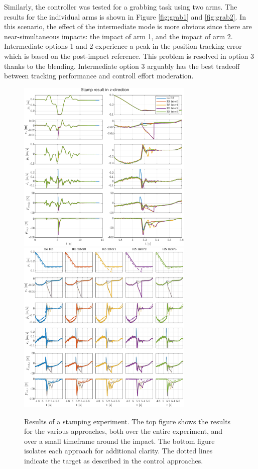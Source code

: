 \documentclass[11pt]{report}
\numberwithin{equation}{section}        %
\numberwithin{figure}{section}          %
\numberwithin{table}{section}           %
\begin{document}
  Similarly, the controller was tested for a grabbing task using two arms. The results for the individual arms is shown in Figure \ref{fig:grab1} and \ref{fig:grab2}. In this scenario, the effect of the intermediate mode is more obvious since there are near-simultaneous impacts: the impact of arm 1, and the impact of arm 2. Intermediate options 1 and 2 experience a peak in the position tracking error which is based on the post-impact reference. This problem is resolved in option 3 thanks to the blending. Intermediate option 3 arguably has the best tradeoff between tracking performance and controll effort moderation.

\begin{figure}[]
  \centering
  \begin{adjustwidth}{0pt}{5pt}
  \centering
  \includegraphics[width=0.75\textwidth]{Graphics/Stamp result in z-direction_z_1.pdf}\\
    \includegraphics[width=0.75\textwidth]{Graphics/Stamp result in z-direction_z_2.pdf}
  \end{adjustwidth}
  \caption{Results of a stamping experiment. The top figure shows the results for the various approaches, both over the entire experiment, and over a small timeframe around the impact. The bottom figure isolates each approach for additional clarity. The dotted lines indicate the target as described in the control approaches.}
  \label{fig:stamp}
  \end{figure}
\end{document}
